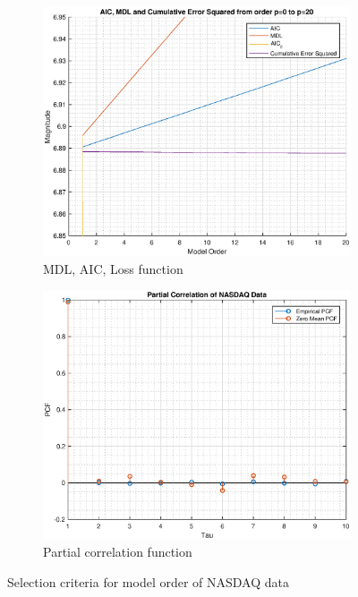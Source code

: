 \documentclass{article}
\begin{document}
\begin{figure}[h!]
\centering
\begin{subfigure}{0.32\textwidth}
\centering
\includegraphics[width = \textwidth]{nasdaq_mdl}
\caption{MDL, AIC, Loss function}
\label{fig:nasdaq_mdl}
\end{subfigure}
\begin{subfigure}{0.32\textwidth}
\centering
\includegraphics[width = \textwidth]{nasdaq_pcf}
\caption{Partial correlation function}
\label{fig:nasdaq_pcf}
\end{subfigure}
\caption{Selection criteria for model order of NASDAQ data}
\label{fig:cramer_ar1}
\end{figure}
\end{document}

